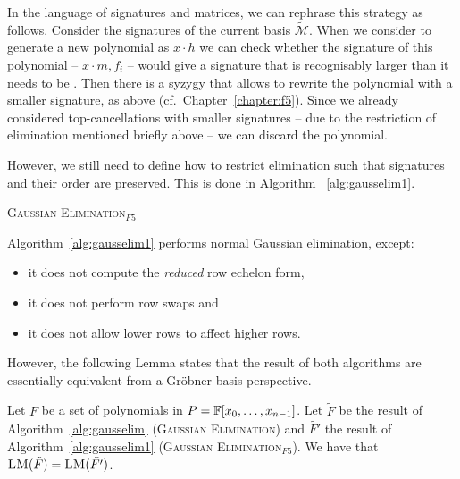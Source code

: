 In the language of signatures and matrices, we can rephrase this strategy as follows. Consider the signatures of the current basis $\tilde{\mathcal{M}}$. When we consider to generate a new polynomial as $x \cdot h$ we can check whether the signature of this polynomial -- $x\cdot m, f_i$ -- would give a signature that is recognisably larger than it needs to be . Then there is a syzygy that allows to rewrite the polynomial with a smaller signature, as above (cf.\ Chapter\ \ref{chapter:f5}). Since we already considered top-cancellations with smaller signatures -- due to the restriction of elimination mentioned briefly above -- we can discard the polynomial.

However, we still need to define how to restrict elimination such that signatures and their order are preserved. This is done in Algorithm
~\ref{alg:gausselim1}.

\begin{algorithm}

\caption{\textsc{Gaussian Elimination}$_{F5}$}
\label{alg:gausselim1}
\end{algorithm}

Algorithm~\ref{alg:gausselim1} performs
normal Gaussian elimination, except:
\begin{itemize}
 \item it does not compute the \emph{reduced} row echelon form,
 \item it does not perform row swaps and
 \item it does not allow lower rows to affect higher rows.
\end{itemize}

However, the following Lemma states that the result of both algorithms are essentially equivalent from a Gröbner basis perspective.

\begin{lemma}
\label{lem:gauss_correct}
Let $F$ be a set of polynomials in $P = \mathbb{F}[x_0,\dots,x_{n-1}]$. Let $\tilde{F}$ be the result of Algorithm~\ref{alg:gausselim} (\textsc{Gaussian Elimination}) and $\tilde{F'}$ the result of Algorithm~\ref{alg:gausselim1} (\textsc{Gaussian Elimination}$_{F5}$). We have that $\textsc{LM}(\tilde{F})  = \textsc{LM}(\tilde{F'})$. 
\end{lemma}

